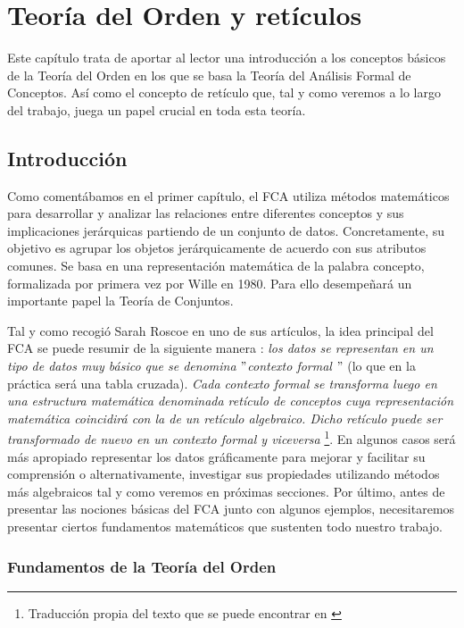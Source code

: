 \documentclass[oneside,openright,titlepage,numbers=noenddot,openany,headinclude,footinclude=true,
cleardoublepage=empty,abstractoff,BCOR=5mm,paper=a4,fontsize=12pt,main=spanish]{scrreprt}
\begin{document}
\chapter{Teoría del Orden y retículos}
   \label{chap:2}
Este capítulo trata de aportar al lector una introducción a los conceptos básicos de la Teoría del Orden en los que se basa la Teoría del Análisis Formal de Conceptos. Así como el concepto de retículo que, tal y como veremos a lo largo del trabajo, juega un papel crucial en toda esta teoría.
\section{Introducción}

Como comentábamos en el primer capítulo, el FCA utiliza métodos matemáticos para desarrollar y analizar las relaciones entre diferentes conceptos y sus implicaciones jerárquicas partiendo de un conjunto de datos. Concretamente, su objetivo es agrupar los objetos jerárquicamente de acuerdo con sus atributos comunes. Se basa en una representación matemática de la palabra concepto, formalizada por primera vez por Wille \cite{willeconcept} en 1980. Para ello desempeñará un importante papel la Teoría de Conjuntos.

Tal y como recogió Sarah Roscoe en uno de sus artículos, la idea principal del FCA se puede resumir de la siguiente manera  \cite{idea_fca}:  \textit{los datos se representan en un tipo de datos muy básico que se denomina} $"$\textit{contexto formal} $"$ (lo que en la práctica será una tabla cruzada).\textit{ Cada contexto formal se transforma luego en una estructura matemática denominada retículo de conceptos cuya representación matemática coincidirá con la de un retículo algebraico. Dicho retículo puede ser transformado de nuevo en un contexto formal y viceversa }\footnote{Traducción propia del texto que se puede encontrar en \cite{idea_fca}}. En algunos casos será más apropiado representar los datos gráficamente para mejorar y facilitar su comprensión o alternativamente, investigar sus propiedades utilizando métodos más algebraicos tal y como veremos en próximas secciones. Por último, antes de presentar las nociones básicas del FCA junto con algunos  ejemplos, necesitaremos presentar ciertos fundamentos matemáticos que sustenten todo nuestro trabajo.


\subsection{Fundamentos de la Teoría del Orden}
\end{document}
